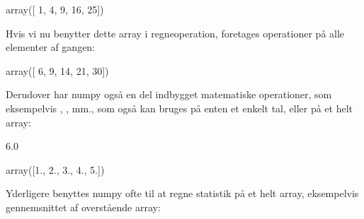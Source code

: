 \documentclass[letterpaper,10pt,english]{jupyterBook}
\begin{document}
\begin{sphinxVerbatim}[commandchars=\\\{\}]
array([ 1,  4,  9, 16, 25])
\end{sphinxVerbatim}

Hvis vi nu benytter dette array i regneoperation, foretages operationer på alle elementer af gangen:

\begin{sphinxVerbatim}[commandchars=\\\{\}]
   
\end{sphinxVerbatim}

\begin{sphinxVerbatim}[commandchars=\\\{\}]
array([ 6,  9, 14, 21, 30])
\end{sphinxVerbatim}

Derudover har numpy også en del indbygget matematiske operationer, som eksempelvis , ,  mm., som også kan bruges på enten et enkelt tal, eller på et helt array:

\begin{sphinxVerbatim}[commandchars=\\\{\}]
\end{sphinxVerbatim}

\begin{sphinxVerbatim}[commandchars=\\\{\}]
6.0
\end{sphinxVerbatim}

\begin{sphinxVerbatim}[commandchars=\\\{\}]
\end{sphinxVerbatim}

\begin{sphinxVerbatim}[commandchars=\\\{\}]
array([1., 2., 3., 4., 5.])
\end{sphinxVerbatim}

Yderligere benyttes numpy ofte til at regne statistik på et helt array, eksempelvis gennemsnittet af overstående array:

\begin{sphinxVerbatim}[commandchars=\\\{\}]
\end{sphinxVerbatim}
\end{document}
